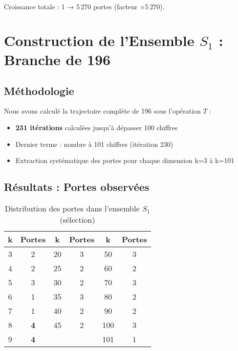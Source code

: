 \documentclass[12pt,a4paper]{article}
\theoremstyle{remark}
\begin{document}
Croissance totale : 1 → 5\,270 portes (facteur ×5\,270).


\section{Construction de l'Ensemble $S_1$ : Branche de 196}
\label{sec:ensemble_s1}

\subsection{Méthodologie}

Nous avons calculé la trajectoire complète de 196 sous l'opération $T$ :

\begin{itemize}
\item \textbf{231 itérations} calculées jusqu'à dépasser 100 chiffres
\item Dernier terme : nombre à 101 chiffres (itération 230)
\item Extraction systématique des portes pour chaque dimension k=3 à k=101
\end{itemize}

\subsection{Résultats : Portes observées}

\begin{table}[h]
\centering
\caption{Distribution des portes dans l'ensemble $S_1$ (sélection)}
\label{tab:distribution_S1}
\begin{tabular}{cc|cc|cc}
\toprule
\textbf{k} & \textbf{Portes} & \textbf{k} & \textbf{Portes} & \textbf{k} & \textbf{Portes}\\
\midrule
3 & 2 & 20 & 3 & 50 & 3\\
4 & 2 & 25 & 2 & 60 & 2\\
5 & 3 & 30 & 2 & 70 & 3\\
6 & 1 & 35 & 3 & 80 & 2\\
7 & 1 & 40 & 2 & 90 & 2\\
8 & \textbf{4} & 45 & 2 & 100 & 3\\
9 & \textbf{4} & & & 101 & 1\\
\bottomrule
\end{tabular}
\end{table}
\end{document}
